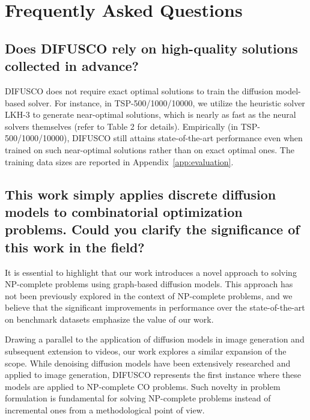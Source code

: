 





























\appendix



\section{Frequently Asked Questions}

\subsection{Does DIFUSCO rely on high-quality solutions collected in advance?}

DIFUSCO does not require exact optimal solutions to train the diffusion model-based solver. For instance, in TSP-500/1000/10000, we utilize the heuristic solver LKH-3 to generate near-optimal solutions, which is nearly as fast as the neural solvers themselves (refer to Table 2 for details). Empirically (in TSP-500/1000/10000), DIFUSCO still attains state-of-the-art performance even when trained on such near-optimal solutions rather than on exact optimal ones. The training data sizes are reported in Appendix~\ref{app:evaluation}.


\subsection{This work simply applies discrete diffusion models to combinatorial optimization problems. Could you clarify the significance of this work in the field?}

It is essential to highlight that our work introduces a novel approach to solving NP-complete problems using graph-based diffusion models. This approach has not been previously explored in the context of NP-complete problems, and we believe that the significant improvements in performance over the state-of-the-art on benchmark datasets emphasize the value of our work.

Drawing a parallel to the application of diffusion models in image generation and subsequent extension to videos, our work explores a similar expansion of the scope. While denoising diffusion models have been extensively researched and applied to image generation, DIFUSCO represents the first instance where these models are applied to NP-complete CO problems. Such novelty in problem formulation is fundamental for solving NP-complete problems instead of incremental ones from a methodological point of view.

